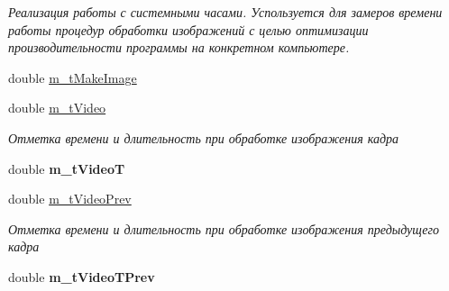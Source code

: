 \begin{DoxyCompactItemize}
\begin{DoxyCompactList}\small\item\em Реализация работы с системными часами. Успользуется для замеров времени работы процедур обработки изображений с целью оптимизации производительности программы на конкретном компьютере. \end{DoxyCompactList}\item 
double \hyperlink{class_c_v_i_engine_base_a0e3c27e7d2ed527eca5445a669080838}{m\+\_\+t\+Make\+Image}
\item 
double \hyperlink{class_c_v_i_engine_base_a0d6409bd350e84190cd6904732c4fe83}{m\+\_\+t\+Video}
\begin{DoxyCompactList}\small\item\em Отметка времени и длительность при обработке изображения кадра \end{DoxyCompactList}\item 
\hypertarget{class_c_v_i_engine_base_a98df2a6b3724ab56deee0ed61e3773f8}{double {\bfseries m\+\_\+t\+Video\+T}}\label{class_c_v_i_engine_base_a98df2a6b3724ab56deee0ed61e3773f8}

\item 
double \hyperlink{class_c_v_i_engine_base_a45286d497ebc137775cda4999ff9fed6}{m\+\_\+t\+Video\+Prev}
\begin{DoxyCompactList}\small\item\em Отметка времени и длительность при обработке изображения предыдущего кадра \end{DoxyCompactList}\item 
\hypertarget{class_c_v_i_engine_base_ac29a85370558b6c5dce1ee2ba1517689}{double {\bfseries m\+\_\+t\+Video\+T\+Prev}}\label{class_c_v_i_engine_base_ac29a85370558b6c5dce1ee2ba1517689}


\end{DoxyCompactItemize}
